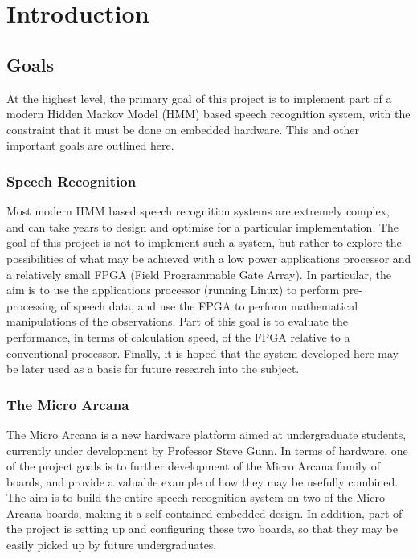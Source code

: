 \chapter{Introduction} %
\label{cha:introduction}

\section{Goals} %
\label{sec:goals}
	At the highest level, the primary goal of this project is to implement part of a modern Hidden Markov Model (HMM)  based speech recognition system, with the constraint that it must be done on embedded hardware.  This and other important goals are outlined here.

	\subsection{Speech Recognition} %
	\label{sec:speech_recognition}
		Most modern HMM based speech recognition systems are extremely complex, and can take years to design and optimise for a particular implementation.  The goal of this project is not to implement such a system, but rather to explore the possibilities of what may be achieved with a low power applications processor and a relatively small FPGA (Field Programmable Gate Array).  In particular, the aim is to use the applications processor (running Linux) to perform pre-processing of speech data, and use the FPGA to perform mathematical manipulations of the observations.  Part of this goal is to evaluate the performance, in terms of calculation speed, of the FPGA relative to a conventional processor.  Finally, it is hoped that the system developed here may be later used as a basis for future research into the subject.

	\subsection{The Micro Arcana} %
	\label{sec:the_micro_arcana}
		The Micro Arcana is a new hardware platform aimed at undergraduate students, currently under development by Professor Steve Gunn.
		In terms of hardware, one of the project goals is to further development of the Micro Arcana family of boards, and provide a valuable example of how they may be usefully combined.  The aim is to build the entire speech recognition system on two of the Micro Arcana boards, making it a self-contained embedded design.  In addition, part of the project is setting up and configuring these two boards, so that they may be easily picked up by future undergraduates.

